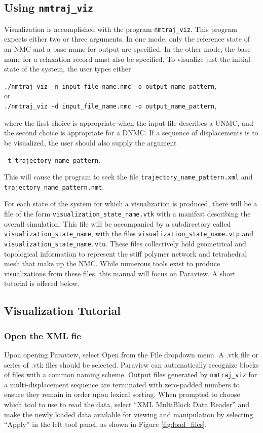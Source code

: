 \documentclass{article}
\begin{document}
\subsection{Using \texttt{nmtraj\_viz}}
Visualization is accomplished with the program \texttt{nmtraj\_viz}. This
program expects either two or three arguments. In one mode, only the
reference state of an NMC and a base name for output are specified. In the
other mode, the base name for a relaxation record must also be specified.
To visualize just the initial state of the system, the user types either
\begin{center}
\texttt{./nmtraj\_viz -n input\_file\_name.nmc -o output\_name\_pattern},
\\or
\\\texttt{./nmtraj\_viz -d input\_file\_name.nmc -o output\_name\_pattern},
\end{center}
where the first choice is appropriate when the input file describes a UNMC,
and the second choice is appropriate for a DNMC. If a sequence of displacements
is to be visualized, the user should also supply the argument
\begin{center}
\texttt{-t trajectory\_name\_pattern}.
\end{center}
This will cause the program to
seek the file \texttt{trajectory\_name\_pattern.xml} and
\texttt{trajectory\_name\_pattern.nmt}.

For each state of the system for which a visualization is produced, there will
be a file of the form \texttt{visualization\_state\_name.vtk} with a manifest
describing the overall simulation. This file will be accompanied by a
subdirectory called \texttt{visualization\_state\_name}, with the files
\texttt{visualization\_state\_name.vtp} and 
\texttt{visualization\_state\_name.vtu}. These files collectively hold
geometrical and topological information to represent the stiff polymer network
and tetrahedral mesh that make up the NMC. While numerous tools exist to
produce visualizations from these files, this manual will focus on Paraview. A
short tutorial is offered below.

\subsection{Visualization Tutorial}
\subsubsection{Open the XML fie}
Upon opening Paraview, select \textsf{\textmd{Open}} from the \textsf{\textmd{File}} dropdown
menu. A .vtk file or series of .vtk files should be selected. Paraview can
automatically recognize blocks of files with a common naming scheme. Output
files generated by \texttt{nmtraj\_viz} for a multi-displacement sequence are 
terminated with zero-padded numbers to ensure they remain in order upon lexical
sorting. When prompted to choose which tool to use to read the data, select 
``\textsf{\textmd{XML MultiBlock Data Reader}}'' and make the newly loaded
data available for viewing and manipulation by selecting 
``\textsf{\textmd{Apply}}'' in the left tool panel, as shown in Figure
\ref{fig:load_files}.
\end{document}
